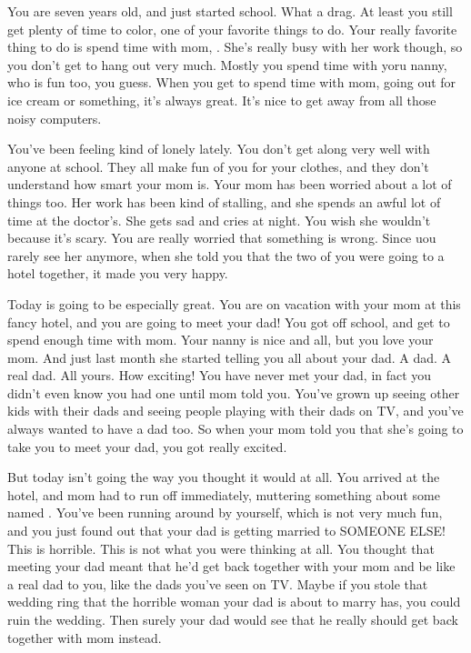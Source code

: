 \documentclass[char]{guildcamp1}
\begin{document}
\name{\cKid{}}

You are seven years old, and just started school. What a drag. At least you still get plenty of time to color, one of your favorite things to do. Your really favorite thing to do is spend time with mom, \cScientist{}. She's really busy with her work though, so you don't get to hang out very much. Mostly you spend time with yoru nanny, who is fun too, you guess. When you get to spend time with mom, going out for ice cream or something, it's always great. It's nice to get away from all those noisy computers.

You've been feeling kind of lonely lately. You don't get along very well with anyone at school. They all make fun of you for your clothes, and they don't understand how smart your mom is. Your mom has been worried about a lot of things too. Her work has been kind of stalling, and she spends an awful lot of time at the doctor's. She gets sad and cries at night. You wish she wouldn't because it's scary. You are really worried that something is wrong. Since uou rarely see her anymore, when she told you that the two of you were going to a hotel together, it made you very happy.

Today is going to be especially great. You are on vacation with your mom at this fancy hotel, and you are going to meet your dad! You got off school, and get to spend enough time with mom. Your nanny is nice and all, but you love your mom. And just last month she started telling you all about your dad. A dad. A real dad. All yours. How exciting! You have never met your dad, in fact you didn't even know you had one until mom told you. You've grown up seeing other kids with their dads and seeing people playing with their dads on TV, and you've always wanted to have a dad too. So when your mom told you that she's going to take you to meet your dad, you got really excited.

But today isn't going the way you thought it would at all. You arrived at the hotel, and mom had to run off immediately, muttering something about some \cRival{\human} named \cRival{}. You've been running around by yourself, which is not very much fun, and you just found out that your dad is getting married to SOMEONE ELSE! This is horrible. This is not what you were thinking at all. You thought that meeting your dad meant that he'd get back together with your mom and be like a real dad to you, like the dads you've seen on TV. Maybe if you stole that wedding ring that the horrible woman your dad is about to marry has, you could ruin the wedding. Then surely your dad would see that he really should get back together with mom instead.
\end{document}
